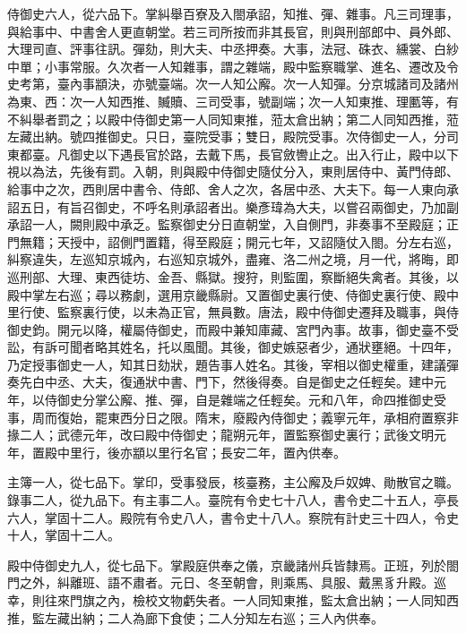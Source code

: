 \begin{pinyinscope}
 侍御史六人，從六品下。掌糾舉百寮及入閤承詔，知推、彈、雜事。凡三司理事，與給事中、中書舍人更直朝堂。若三司所按而非其長官，則與刑部郎中、員外郎、大理司直、評事往訊。彈劾，則大夫、中丞押奏。大事，法冠、硃衣、纁裳、白紗中單；小事常服。久次者一人知雜事，謂之雜端，殿中監察職掌、進名、遷改及令史考第，臺內事顓決，亦號臺端。次一人知公廨。次一人知彈。分京城諸司及諸州為東、西：次一人知西推、贓贖、三司受事，號副端；次一人知東推、理匭等，有不糾舉者罰之；以殿中侍御史第一人同知東推，蒞太倉出納；第二人同知西推，蒞左藏出納。號四推御史。只日，臺院受事；雙日，殿院受事。次侍御史一人，分司東都臺。凡御史以下遇長官於路，去戴下馬，長官斂轡止之。出入行止，殿中以下視以為法，先後有罰。入朝，則與殿中侍御史隨仗分入，東則居侍中、黃門侍郎、給事中之次，西則居中書令、侍郎、舍人之次，各居中丞、大夫下。每一人東向承詔五日，有旨召御史，不呼名則承詔者出。樂彥瑋為大夫，以嘗召兩御史，乃加副承詔一人，闕則殿中承乏。監察御史分日直朝堂，入自側門，非奏事不至殿庭；正門無籍；天授中，詔側門置籍，得至殿庭；開元七年，又詔隨仗入閤。分左右巡，糾察違失，左巡知京城內，右巡知京城外，盡雍、洛二州之境，月一代，將晦，即巡刑部、大理、東西徒坊、金吾、縣獄。搜狩，則監圍，察斷絕失禽者。其後，以殿中掌左右巡；尋以務劇，選用京畿縣尉。又置御史裏行使、侍御史裏行使、殿中里行使、監察裏行使，以未為正官，無員數。唐法，殿中侍御史遷拜及職事，與侍御史鈞。開元以降，權屬侍御史，而殿中兼知庫藏、宮門內事。故事，御史臺不受訟，有訴可聞者略其姓名，托以風聞。其後，御史嫉惡者少，通狀壅絕。十四年，乃定授事御史一人，知其日劾狀，題告事人姓名。其後，宰相以御史權重，建議彈奏先白中丞、大夫，復通狀中書、門下，然後得奏。自是御史之任輕矣。建中元年，以侍御史分掌公廨、推、彈，自是雜端之任輕矣。元和八年，命四推御史受事，周而復始，罷東西分日之限。隋末，廢殿內侍御史；義寧元年，承相府置察非掾二人；武德元年，改曰殿中侍御史；龍朔元年，置監察御史裏行；武後文明元年，置殿中里行，後亦顓以里行名官；長安二年，置內供奉。



 主簿一人，從七品下。掌印，受事發辰，核臺務，主公廨及戶奴婢、勛散官之職。錄事二人，從九品下。有主事二人。臺院有令史七十八人，書令史二十五人，亭長六人，掌固十二人。殿院有令史八人，書令史十八人。察院有計史三十四人，令史十人，掌固十二人。



 殿中侍御史九人，從七品下。掌殿庭供奉之儀，京畿諸州兵皆隸焉。正班，列於閤門之外，糾離班、語不肅者。元日、冬至朝會，則乘馬、具服、戴黑豸升殿。巡幸，則往來門旗之內，檢校文物虧失者。一人同知東推，監太倉出納；一人同知西推，監左藏出納；二人為廊下食使；二人分知左右巡；三人內供奉。




\end{pinyinscope}

